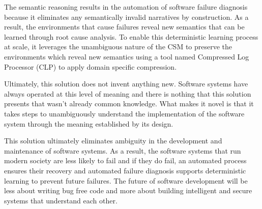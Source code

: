 \documentclass{article}
\begin{document}
The semantic reasoning results in the automation of software failure diagnosis because it eliminates any semantically invalid narratives by construction. As a result, the environments that cause failures reveal new semantics that can be learned through root cause analysis. To enable this deterministic learning process at scale, it leverages the unambiguous nature of the CSM to preserve the environments which reveal new semantics using a tool named Compressed Log Processor (CLP) to apply domain specific compression.

Ultimately, this solution does not invent anything new. Software systems have always operated at this level of meaning and there is nothing that this solution presents that wasn't already common knowledge. What makes it novel is that it takes steps to unambiguously understand the implementation of the software system through the meaning established by its design.

This solution ultimately eliminates ambiguity in the development and maintenance of software systems. As a result, the software systems that run modern society are less likely to fail and if they do fail, an automated process ensures their recovery and automated failure diagnosis supports deterministic learning to prevent future failures. The future of software development will be less about writing bug free code and more about building intelligent and secure systems that understand each other.
\end{document}
